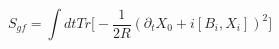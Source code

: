 \begin{equation}
S_{gf}=\int dt Tr \Bigg [ -\frac{1}{2R} (\partial_t X_0 +i [B_i,
X_i])^2  \Bigg]
\end{equation}

